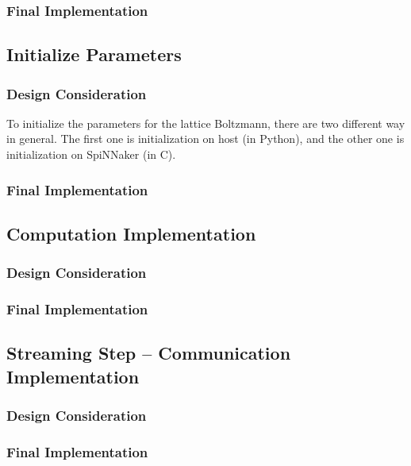 \subsubsection{Final Implementation}


\subsection{Initialize Parameters} \label{sec:ip}
\subsubsection{Design Consideration}
To initialize the parameters for the lattice Boltzmann, there are two different way in general. The first one is initialization on host (in Python), and the other one is initialization on SpiNNaker (in C).
\subsubsection{Final Implementation}


\subsection{Computation Implementation} \label{sec:cp}
\subsubsection{Design Consideration}
\subsubsection{Final Implementation}

\subsection{Streaming Step -- Communication Implementation} \label{sec:ssc}
\subsubsection{Design Consideration}
\subsubsection{Final Implementation}